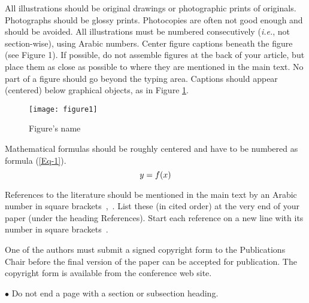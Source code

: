 \documentclass[a4paper, times, 10pt,twocolumn]{article}
\begin{document}
All illustrations should be original drawings or photographic prints
of originals. Photographs should be glossy prints. Photocopies are
often not good enough and should be avoided. All illustrations must
be numbered consecutively (\textit{i.e.}, not section-wise), using Arabic
numbers.  Center figure captions beneath the figure (see Figure 1).
If possible, do not assemble figures at the back of your article,
but place them as close as possible to where they are mentioned in
the main text. No part of a figure should go beyond the typing area.
Captions should appear (centered) below graphical objects, as in
Figure \ref{Fig:Figure 1}.
\begin{figure}[h]
\centering
\texttt{[image: figure1]}
\caption{Figure's name} \label{Fig:Figure 1}
\end{figure}


Mathematical formulas should be roughly centered and have to be
numbered as formula (\ref{Eq-1}).
\begin{equation}\label{Eq-1}
\centering{y=f(x)}
\end{equation}


References to the literature should be mentioned in the main text by
an Arabic number in square brackets~\cite{Peter},~\cite{John}. List
these (in cited order) at the very end of your paper (under the
heading References). Start each reference on a new line with its
number in square brackets~\cite{Xizhao}.


One of the authors must submit a signed copyright form to the
Publications Chair before the final version of the paper can be
accepted for publication. The copyright form is available from the
conference web site.

\hspace{-3ex}    $\bullet$ \hspace{1ex} Do not end a page with a
section or subsection heading.
\end{document}
